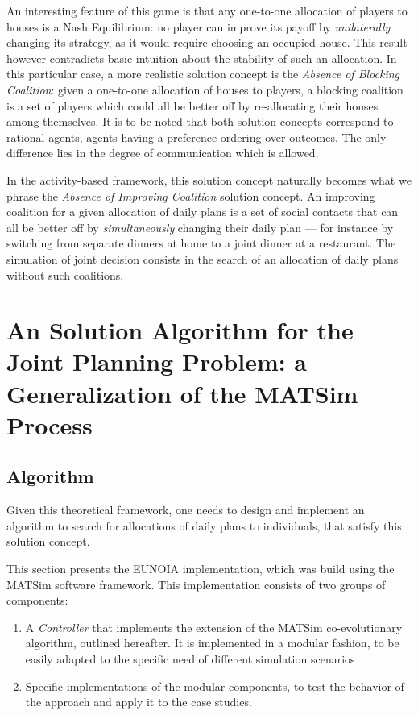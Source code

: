 {An interesting feature of this game is that any one-to-one allocation of players to houses is a
Nash Equilibrium: no player can improve its payoff by \emph{unilaterally} changing its strategy,
as it would require choosing an occupied house.
This result however contradicts basic intuition about the stability of such an allocation.
In this particular case, a more realistic solution concept is the \emph{Absence of Blocking Coalition}:
given a one-to-one allocation of houses to players, a blocking coalition is a set of players
which could all be better off by re-allocating their houses among themselves.
%
It is to be noted that both solution concepts correspond to rational agents, \ie agents having
a preference ordering over outcomes.
The only difference lies in the degree
of communication which is allowed.

In the activity-based framework, this solution concept naturally becomes what we phrase
the \emph{Absence of Improving Coalition} solution concept.
An improving coalition for a given allocation of daily plans
is a set of social contacts that can all be better off by \emph{simultaneously} changing
their daily plan
--- for instance by switching from separate dinners at home to a joint dinner at a restaurant.
The simulation of joint decision consists in the search of an allocation of daily plans
without such coalitions.



\section{An Solution Algorithm for the Joint Planning Problem: a Generalization of the MATSim Process\label{sec:td:algo}}

\subsection{Algorithm}

Given this theoretical framework, one needs to design and implement an
algorithm to search for allocations of daily plans to individuals, that
satisfy this solution concept.

This section presents the EUNOIA implementation, which was build using
the MATSim software framework. This implementation consists of two
groups of components:

\begin{enumerate}
\item
  A \emph{Controller} that implements the extension of the MATSim
  co-evolutionary algorithm, outlined hereafter. It is implemented in a
  modular fashion, to be easily adapted to the specific need of
  different simulation scenarios
\item
  Specific implementations of the modular components, to test the
  behavior of the approach and apply it to the case studies.


\end{enumerate}}
